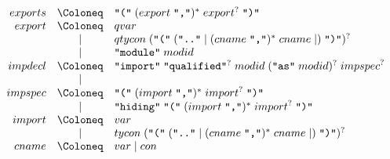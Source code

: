 \begin{align*}
  \begin{array}{rcl}
    {exports}
    & \Coloneq & \text{\texttt{\textquotedbl(\textquotedbl}}\; ({export}\; \text{\texttt{\textquotedbl,\textquotedbl}})^*\; {export}^?\; \text{\texttt{\textquotedbl)\textquotedbl}} \\
    {export}
    & \Coloneq & {qvar} \\
    & \mid & {qtycon}\; (\text{\texttt{\textquotedbl(\textquotedbl}}\; (\text{\texttt{\textquotedbl..\textquotedbl}} \mid ({cname}\; \text{\texttt{\textquotedbl,\textquotedbl}})^*\; {cname} \mid )\; \text{\texttt{\textquotedbl)\textquotedbl}})^? \\
    & \mid & \text{\texttt{\textquotedbl module\textquotedbl}}\; {modid} \\
    {impdecl}
    & \Coloneq & \text{\texttt{\textquotedbl import\textquotedbl}}\; \text{\texttt{\textquotedbl qualified\textquotedbl}}^?\; {modid}\; (\text{\texttt{\textquotedbl as\textquotedbl}}\; {modid})^?\; {impspec}^? \\
    & \mid & \\
    {impspec}
    & \Coloneq & \text{\texttt{\textquotedbl(\textquotedbl}}\; ({import}\; \text{\texttt{\textquotedbl,\textquotedbl}})^*\; {import}^?\; \text{\texttt{\textquotedbl)\textquotedbl}} \\
    & \mid & \text{\texttt{\textquotedbl hiding\textquotedbl}}\;\text{\texttt{\textquotedbl(\textquotedbl}}\; ({import}\; \text{\texttt{\textquotedbl,\textquotedbl}})^*\; {import}^?\; \text{\texttt{\textquotedbl)\textquotedbl}} \\
    {import}
    & \Coloneq & {var} \\
    & \mid & {tycon}\; (\text{\texttt{\textquotedbl(\textquotedbl}}\; (\text{\texttt{\textquotedbl..\textquotedbl}} \mid ({cname}\; \text{\texttt{\textquotedbl,\textquotedbl}})^*\; {cname} \mid )\; \text{\texttt{\textquotedbl)\textquotedbl}})^? \\
    {cname}
    & \Coloneq & {var} \mid {con}
  \end{array}
\end{align*}

